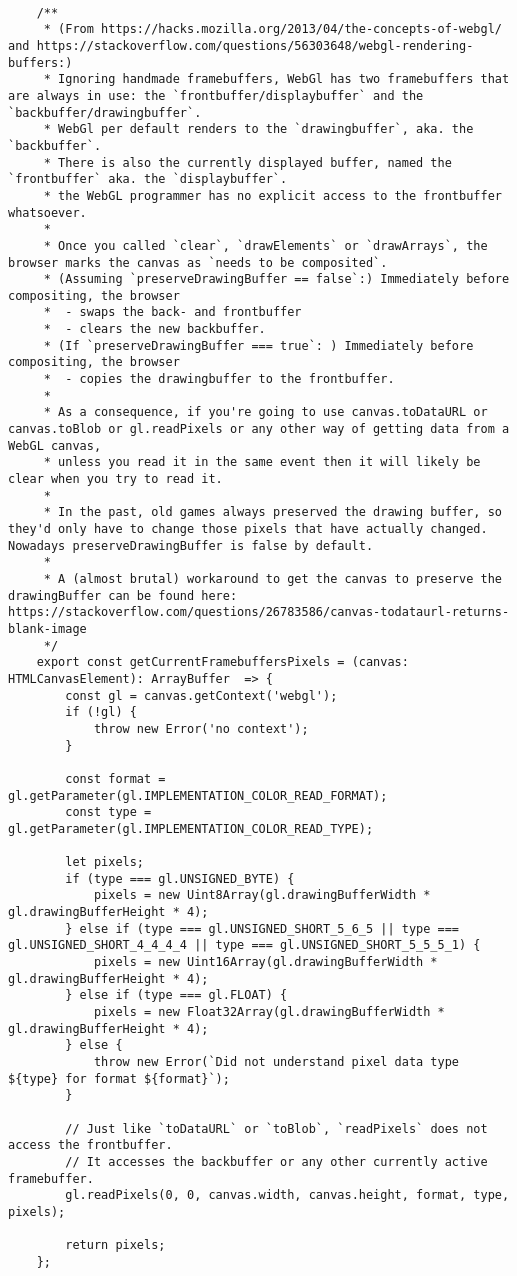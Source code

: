 \begin{lstlisting}
    
    /**
     * (From https://hacks.mozilla.org/2013/04/the-concepts-of-webgl/ and https://stackoverflow.com/questions/56303648/webgl-rendering-buffers:)
     * Ignoring handmade framebuffers, WebGl has two framebuffers that are always in use: the `frontbuffer/displaybuffer` and the `backbuffer/drawingbuffer`.
     * WebGl per default renders to the `drawingbuffer`, aka. the `backbuffer`.
     * There is also the currently displayed buffer, named the `frontbuffer` aka. the `displaybuffer`.
     * the WebGL programmer has no explicit access to the frontbuffer whatsoever.
     *
     * Once you called `clear`, `drawElements` or `drawArrays`, the browser marks the canvas as `needs to be composited`.
     * (Assuming `preserveDrawingBuffer == false`:) Immediately before compositing, the browser
     *  - swaps the back- and frontbuffer
     *  - clears the new backbuffer.
     * (If `preserveDrawingBuffer === true`: ) Immediately before compositing, the browser
     *  - copies the drawingbuffer to the frontbuffer.
     *
     * As a consequence, if you're going to use canvas.toDataURL or canvas.toBlob or gl.readPixels or any other way of getting data from a WebGL canvas,
     * unless you read it in the same event then it will likely be clear when you try to read it.
     *
     * In the past, old games always preserved the drawing buffer, so they'd only have to change those pixels that have actually changed. Nowadays preserveDrawingBuffer is false by default.
     *
     * A (almost brutal) workaround to get the canvas to preserve the drawingBuffer can be found here: https://stackoverflow.com/questions/26783586/canvas-todataurl-returns-blank-image
     */
    export const getCurrentFramebuffersPixels = (canvas: HTMLCanvasElement): ArrayBuffer  => {
        const gl = canvas.getContext('webgl');
        if (!gl) {
            throw new Error('no context');
        }
    
        const format = gl.getParameter(gl.IMPLEMENTATION_COLOR_READ_FORMAT);
        const type = gl.getParameter(gl.IMPLEMENTATION_COLOR_READ_TYPE);
    
        let pixels;
        if (type === gl.UNSIGNED_BYTE) {
            pixels = new Uint8Array(gl.drawingBufferWidth * gl.drawingBufferHeight * 4);
        } else if (type === gl.UNSIGNED_SHORT_5_6_5 || type === gl.UNSIGNED_SHORT_4_4_4_4 || type === gl.UNSIGNED_SHORT_5_5_5_1) {
            pixels = new Uint16Array(gl.drawingBufferWidth * gl.drawingBufferHeight * 4);
        } else if (type === gl.FLOAT) {
            pixels = new Float32Array(gl.drawingBufferWidth * gl.drawingBufferHeight * 4);
        } else {
            throw new Error(`Did not understand pixel data type ${type} for format ${format}`);
        }
    
        // Just like `toDataURL` or `toBlob`, `readPixels` does not access the frontbuffer.
        // It accesses the backbuffer or any other currently active framebuffer.
        gl.readPixels(0, 0, canvas.width, canvas.height, format, type, pixels);
    
        return pixels;
    };        
\end{lstlisting}

